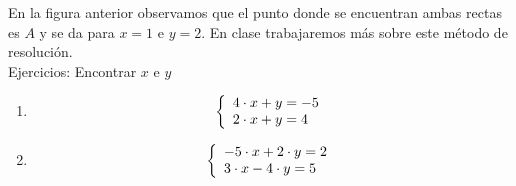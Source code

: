 \begin{figure}[H]
\centering
{}
\label{2.0}
\end{figure}

En la figura anterior observamos que el punto donde se encuentran ambas rectas es $A$ y se da para $x=1$ e $y=2$. En clase trabajaremos más sobre este método de resolución.\\
\medskip
Ejercicios: Encontrar $x$ e $y$
\begin{enumerate}
\renewcommand{\labelenumi}{{\theenumi})}
\item 
    \begin{equation}
    \notag
     \left\{ \begin{array}{lcc}
             4\cdot x +y =-5 
             \\2\cdot x + y = 4
             \end{array}
   \right.
   \end{equation}
\item 
    \begin{equation}
    \notag
     \left\{ \begin{array}{lcc}
             -5\cdot x +2\cdot y =2
             \\3\cdot x-4\cdot  y = 5
             \end{array}
   \right.
     \end{equation}


\end{enumerate}

